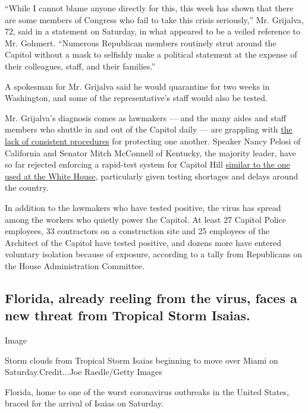 ``While I cannot blame anyone directly for this, this week has shown
that there are some members of Congress who fail to take this crisis
seriously,'' Mr. Grijalva, 72, said in a statement on Saturday, in what
appeared to be a veiled reference to Mr. Gohmert. ``Numerous Republican
members routinely strut around the Capitol without a mask to selfishly
make a political statement at the expense of their colleagues, staff,
and their families.''

A spokesman for Mr. Grijalva said he would quarantine for two weeks in
Washington, and some of the representative's staff would also be tested.

Mr. Grijalva's diagnosis comes as lawmakers --- and the many aides and
staff members who shuttle in and out of the Capitol daily --- are
grappling with
\href{https://www.nytimes3xbfgragh.onion/2020/07/30/us/politics/gohmert-coronavirus-congress.html}{the
lack of consistent procedures} for protecting one another. Speaker Nancy
Pelosi of California and Senator Mitch McConnell of Kentucky, the
majority leader, have so far rejected enforcing a rapid-test system for
Capitol Hill
\href{https://www.nytimes3xbfgragh.onion/2020/05/01/us/politics/coronavirus-testing-senate-white-house.html}{similar
to the one used at the White House}, particularly given testing
shortages and delays around the country.

In addition to the lawmakers who have tested positive, the virus has
spread among the workers who quietly power the Capitol. At least 27
Capitol Police employees, 33 contractors on a construction site and 25
employees of the Architect of the Capitol have tested positive, and
dozens more have entered voluntary isolation because of exposure,
according to a tally from Republicans on the House Administration
Committee.

\hypertarget{florida-already-reeling-from-the-virus-faces-a-new-threat-from-tropical-storm-isaias}{%
\subsection{Florida, already reeling from the virus, faces a new threat
from Tropical Storm
Isaias.}\label{florida-already-reeling-from-the-virus-faces-a-new-threat-from-tropical-storm-isaias}}

Image

Storm clouds from Tropical Storm Isaias beginning to move over Miami on
Saturday.Credit...Joe Raedle/Getty Images

Florida, home to one of the worst coronavirus outbreaks in the United
States, braced for the arrival of Isaias on Saturday.

